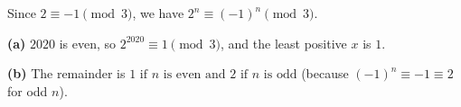 Since $2\equiv-1\pmod3$, we have $2^n\equiv(-1)^n\pmod3$.

\textbf{(a)} $2020$ is even, so $2^{2020}\equiv1\pmod3$, and the least positive $x$ is $\boxed{1}$.

\textbf{(b)} The remainder is $\boxed{1\text{ if }n\text{ is even and }2\text{ if }n\text{ is odd}}$ (because $(-1)^n\equiv-1\equiv2$ for odd $n$).
